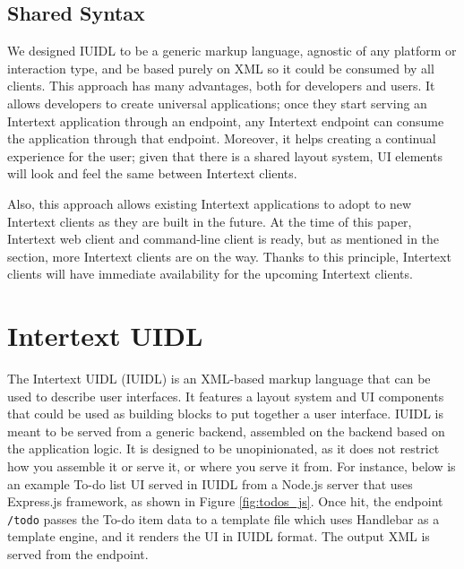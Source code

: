 \subsection{Shared Syntax}

We designed IUIDL to be a generic markup language, agnostic of any platform or interaction type, and be based purely on XML so it could be consumed by all clients. This approach has many advantages, both for developers and users. It allows developers to create universal applications; once they start serving an Intertext application through an endpoint, any Intertext endpoint can consume the application through that endpoint. Moreover, it helps creating a continual experience for the user; given that there is a shared layout system, UI elements will look and feel the same between Intertext clients.

Also, this approach allows existing Intertext applications to adopt to new Intertext clients as they are built in the future. At the time of this paper, Intertext web client and command-line client is ready, but as mentioned in the  section, more Intertext clients are on the way. Thanks to this principle, Intertext clients will have immediate availability for the upcoming Intertext clients.

\section{Intertext UIDL} \label{intertextUIDL}

The Intertext UIDL (IUIDL) is an XML-based markup language that can be used to describe user interfaces. It features a layout system and UI components that could be used as building blocks to put together a user interface. IUIDL is meant to be served from a generic backend, assembled on the backend based on the application logic. It is designed to be unopinionated, as it does not restrict how you assemble it or serve it, or where you serve it from. For instance, below is an example To-do list UI served in IUIDL from a Node.js server that uses Express.js framework, as shown in Figure \ref{fig:todos_js}. Once hit, the endpoint \texttt{/todo} passes the To-do item data to a template file which uses Handlebar as a template engine, and it renders the UI in IUIDL format. The output XML is served from the endpoint.

